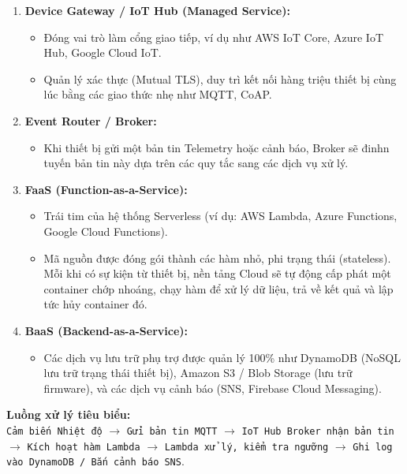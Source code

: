 \begin{enumerate}
    \item \textbf{Device Gateway / IoT Hub (Managed Service):}
    \begin{itemize}
        \item Đóng vai trò làm cổng giao tiếp, ví dụ như AWS IoT Core, Azure IoT Hub, Google Cloud IoT.
        \item Quản lý xác thực (Mutual TLS), duy trì kết nối hàng triệu thiết bị cùng lúc bằng các giao thức nhẹ như MQTT, CoAP.
    \end{itemize}

    \item \textbf{Event Router / Broker:}
    \begin{itemize}
        \item Khi thiết bị gửi một bản tin Telemetry hoặc cảnh báo, Broker sẽ đinhn tuyến bản tin này dựa trên các quy tắc sang các dịch vụ xử lý.
    \end{itemize}

    \item \textbf{FaaS (Function-as-a-Service):}
    \begin{itemize}
        \item Trái tim của hệ thống Serverless (ví dụ: AWS Lambda, Azure Functions, Google Cloud Functions).
        \item Mã nguồn được đóng gói thành các hàm nhỏ, phi trạng thái (stateless). Mỗi khi có sự kiện từ thiết bị, nền tảng Cloud sẽ tự động cấp phát một container chớp nhoáng, chạy hàm để xử lý dữ liệu, trả về kết quả và lập tức hủy container đó.
    \end{itemize}

    \item \textbf{BaaS (Backend-as-a-Service):}
    \begin{itemize}
        \item Các dịch vụ lưu trữ phụ trợ được quản lý 100\% như DynamoDB (NoSQL lưu trữ trạng thái thiết bị), Amazon S3 / Blob Storage (lưu trữ firmware), và các dịch vụ cảnh báo (SNS, Firebase Cloud Messaging).
    \end{itemize}
\end{enumerate}

\noindent\textbf{Luồng xử lý tiêu biểu:}\\
\texttt{Cảm biến Nhiệt độ} $\rightarrow$ \texttt{Gửi bản tin MQTT} $\rightarrow$ \texttt{IoT Hub Broker nhận bản tin} $\rightarrow$ \texttt{Kích hoạt hàm Lambda} $\rightarrow$ \texttt{Lambda xử lý, kiểm tra ngưỡng} $\rightarrow$ \texttt{Ghi log vào DynamoDB / Bắn cảnh báo SNS}.

